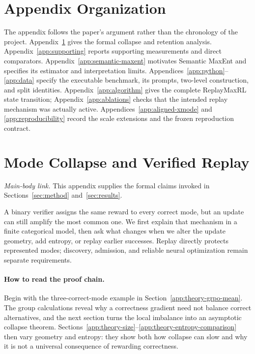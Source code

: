 \documentclass{article}
\newcommand{\1}{\mathbf 1}
\theoremstyle{remark}
\theoremstyle{definition}
\theoremstyle{plain}
\begin{document}



\section*{Appendix Organization}
\label{app:organization}

The appendix follows the paper's argument rather than the chronology of the
project. Appendix~\ref{app:theory} gives the formal collapse and retention
analysis. Appendix~\ref{app:supporting} reports supporting measurements and
direct comparators. Appendix~\ref{app:semantic-maxent} motivates Semantic MaxEnt
and specifies its estimator and interpretation limits.
Appendices~\ref{app:python}--\ref{app:data} specify the executable benchmark,
its prompts, two-level construction, and split identities.
Appendix~\ref{app:algorithm} gives the complete ReplayMaxRL state transition;
Appendix~\ref{app:ablations} checks that the intended replay mechanism was
actually active. Appendices~\ref{app:aligned-xmode} and
\ref{app:reproducibility} record the scale extensions and the frozen
reproduction contract.

\appendix
\onecolumn
\raggedbottom

\section{Mode Collapse and Verified Replay}
\label{app:theory}

\noindent\emph{Main-body link.} This appendix supplies the formal claims
invoked in Sections~\ref{sec:method} and~\ref{sec:results}.

A binary verifier assigns the same reward to every correct mode, but an
update can still amplify the most common one. We first explain that mechanism
in a finite categorical model, then ask what changes when we alter the update
geometry, add entropy, or replay earlier successes. Replay directly protects
represented modes; discovery, admission, and reliable neural optimization
remain separate requirements.

\paragraph{How to read the proof chain.}
Begin with the three-correct-mode example in
Section~\ref{app:theory-grpo-mean}. The group calculations reveal why a
correctness gradient need not balance correct alternatives, and the next
section turns the local imbalance into an asymptotic collapse theorem.
Sections~\ref{app:theory-size}--\ref{app:theory-entropy-comparison} then vary
geometry and entropy: they show both how collapse can slow and why it is not
a universal consequence of rewarding correctness.
\end{document}
